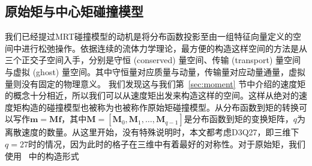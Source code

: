 \subsection{原始矩与中心矩碰撞模型}
\label{sec:background_mrt}
我们已经提过MRT碰撞模型的动机是将分布函数投影至由一组特征向量定义的空间中进行松弛操作。依据连续的流体力学理论，最方便的构造这样空间的方法是从三个正交子空间入手，分别是守恒 (conserved) 量空间、传输 (transport) 量空间与虚拟 (ghost) 量空间。其中守恒量对应质量与动量，传输量对应动量通量，虚拟量则没有固定的物理意义。
我们发现这与我们第~\ref{sec:moment} 节中介绍的速度矩的概念十分相近，所以我们可以从速度矩出发来构造这样的空间。这样从绝对的速度矩构造的碰撞模型也被称为也被称作原始矩碰撞模型。从分布函数到矩的转换可以写作$\mathbf{m}=\mathbf{M}\mathbf{f}$，其中$\mathbf{M}=[\mathbf{M}_0, \mathbf{M}_1, \dots, \mathbf{M}_{q-1}]$是分布函数到矩的变换矩阵，$q$为离散速度的数量。从这里开始，没有特殊说明时，本文都考虑D3Q27，即三维下$q=27$时的情况，因为此时的格子在三维中有着最好的对称性。对于原始矩，我们使用~\citep{PhysRevE.95.013310} 中的构造形式
